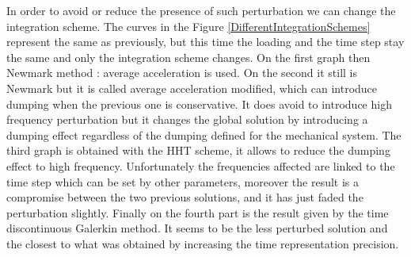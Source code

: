\documentclass[12pt,a4paper]{article}
\begin{document}
In order to avoid or reduce the presence of such perturbation we can change the integration scheme. The curves in the Figure \ref{DifferentIntegrationSchemes} represent the same as previously, but this time the loading and the time step stay the same and only the integration scheme changes. On the first graph then Newmark method : average acceleration is used. On the second it still is Newmark but it is called average acceleration modified, which can introduce dumping when the previous one is conservative. It does avoid to introduce high frequency perturbation but it changes the global solution by introducing a dumping effect regardless of the dumping defined for the mechanical system. The third graph is obtained with the HHT scheme, it allows to reduce the dumping effect to high frequency. Unfortunately the frequencies affected are linked to the time step which can be set by other parameters, moreover the result is a compromise between the two previous solutions, and it has just faded the perturbation slightly. Finally on the fourth part is the result given by the time discontinuous Galerkin method. It seems to be the less perturbed solution and the closest to what was obtained by increasing the time representation precision.
\end{document}
